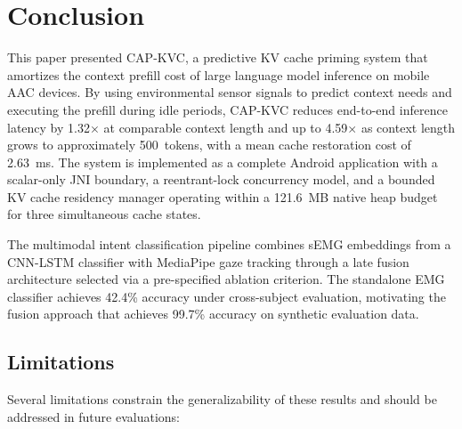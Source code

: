 \section{Conclusion}
\label{sec:conclusion}

This paper presented CAP-KVC, a predictive KV cache priming system that amortizes the context prefill cost of large language model inference on mobile AAC devices. By using environmental sensor signals to predict context needs and executing the prefill during idle periods, CAP-KVC reduces end-to-end inference latency by 1.32$\times$ at comparable context length and up to 4.59$\times$ as context length grows to approximately 500~tokens, with a mean cache restoration cost of 2.63~ms. The system is implemented as a complete Android application with a scalar-only JNI boundary, a reentrant-lock concurrency model, and a bounded KV cache residency manager operating within a 121.6~MB native heap budget for three simultaneous cache states.

The multimodal intent classification pipeline combines sEMG embeddings from a CNN-LSTM classifier with MediaPipe gaze tracking through a late fusion architecture selected via a pre-specified ablation criterion. The standalone EMG classifier achieves 42.4\% accuracy under cross-subject evaluation, motivating the fusion approach that achieves 99.7\% accuracy on synthetic evaluation data.

\subsection{Limitations}

Several limitations constrain the generalizability of these results and should be addressed in future evaluations:

